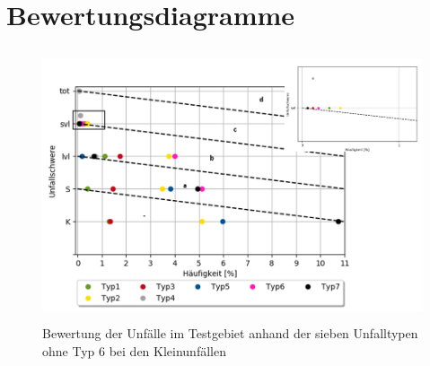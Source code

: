 
\chapter{Bewertungsdiagramme}\label{chapter:Bewertungsdiagramme}

\begin{savenotes}
	\begin{figure}[H]
		\centering
		\includegraphics[width=12cm,height=8cm]{figures/Bewertung_UTF(2)}
		\caption[Bewertung der Unfälle im Testgebiet anhand der sieben Unfalltypen ohne Typ 6 bei den Kleinunfällen]{Bewertung der Unfälle im Testgebiet anhand der sieben Unfalltypen ohne Typ 6 bei den Kleinunfällen}\label{fig:Bewertung_UTF(2)}
	\end{figure}
\end{savenotes}